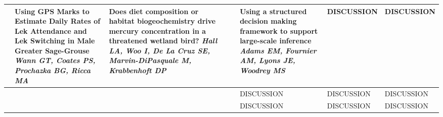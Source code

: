 \begin{tabular}{|x{0.85cm}|x{2.85cm}|x{2.85cm}|x{2.85cm}|x{2.85cm}|a{2.85cm}|a{2.85cm}|a{2.85cm}|}
\hline
{}&Using GPS Marks to Estimate Daily Rates of Lek Attendance and Lek Switching in Male Greater Sage-Grouse \newline \newline \textit{Wann GT, Coates PS, Prochazka BG, Ricca MA} & Does diet composition or habitat biogeochemistry drive mercury concentration in a threatened wetland bird? \newline \newline \textit{Hall LA, Woo I, De La Cruz SE, Marvin-DiPasquale M, Krabbenhoft DP} &  \newline \newline \textit{} &  \newline \newline \textit{} & Using a structured decision making framework to support large-scale inference \newline \newline \textit{Adams EM, Fournier AM, Lyons JE, Woodrey MS} & DISCUSSION \newline \newline \textit{} & DISCUSSION \newline \newline \textit{}\\
\hline
{}& \newline \newline \textit{} &  \newline \newline \textit{} &  \newline \newline \textit{} &  \newline \newline \textit{} & DISCUSSION \newline \newline \textit{} & DISCUSSION \newline \newline \textit{} & DISCUSSION \newline \newline \textit{}\\
\hline
{}& \newline \newline \textit{} &  \newline \newline \textit{} &  \newline \newline \textit{} &  \newline \newline \textit{} & DISCUSSION \newline \newline \textit{} & DISCUSSION \newline \newline \textit{} & DISCUSSION \newline \newline \textit{}\\
\hline
\end{tabular}
